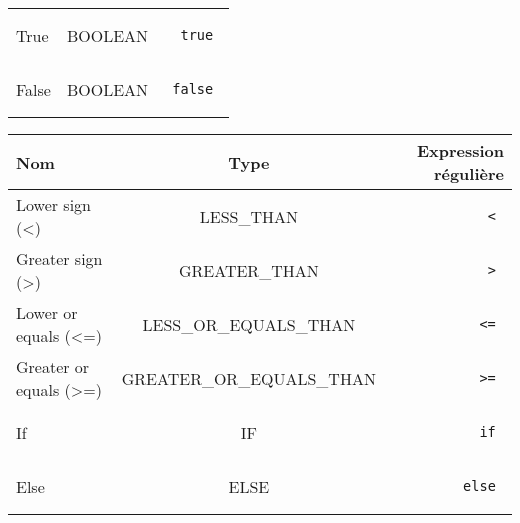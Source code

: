 \documentclass[a4paper,10pt]{article}
\begin{document}
\begin{tabular}{|l|c|r|}
True & BOOLEAN & \begin{minipage}{2in} \begin{verbatim} true \end{verbatim} \end{minipage} \\
False & BOOLEAN & \begin{minipage}{2in} \begin{verbatim} false \end{verbatim} \end{minipage} \\
\hline
\end{tabular}


\begin{tabular}{|l|c|r|}
  \hline
  Nom & Type & Expression régulière \\
  \hline
Lower sign (<) & LESS\_THAN & \begin{minipage}{2in} \begin{verbatim} < \end{verbatim} \end{minipage} \\
Greater sign (>) & GREATER\_THAN & \begin{minipage}{2in} \begin{verbatim} > \end{verbatim} \end{minipage} \\
Lower or equals (<=) & LESS\_OR\_EQUALS\_THAN & \begin{minipage}{2in} \begin{verbatim} <= \end{verbatim} \end{minipage} \\
Greater or equals (>=) & GREATER\_OR\_EQUALS\_THAN & \begin{minipage}{2in} \begin{verbatim} >= \end{verbatim} \end{minipage} \\
If & IF & \begin{minipage}{2in} \begin{verbatim} if \end{verbatim} \end{minipage} \\
Else & ELSE & \begin{minipage}{2in} \begin{verbatim} else \end{verbatim} \end{minipage} \\

\end{tabular}
\end{document}

